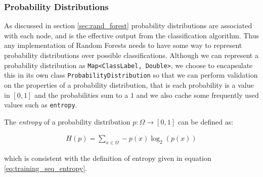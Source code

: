 \documentclass[12pt,twoside,notitlepage]{report}
\begin{document}
            \subsubsection{Probability Distributions} \label{sec:prob_dist}
                As discussed in section \ref{sec:rand_forest} probability distributions are associated with each node, 
                and is the effective output from the classification algorithm. Thus any implementation of Random Forests 
                needs to have some way to represent probability distributions over possible classifications. Although 
                we can represent a probability distribution as \texttt{Map<ClassLabel, Double>}, we choose to 
                encapsulate this in its own class \texttt{ProbabilityDistribution} so that we can perform validation
                on the properties of a probability distribution, that is each probability is a value in $[0,1]$ and 
                the probabilities sum to a $1$ and we also cache some frequently used values such as \texttt{entropy}. 

                The \textit{entropy} of a probability distribution $p:\Omega\rightarrow[0,1]$ can be defined as:

                \begin{align}
                  H(p) = \sum\limits_{x\in\Omega} -p(x) \log_2(p(x))
                  \label{eq:prob_entropy}
                \end{align}

                which is consistent with the definition of entropy given in equation \ref{eq:training_seq_entropy}.
\end{document}
